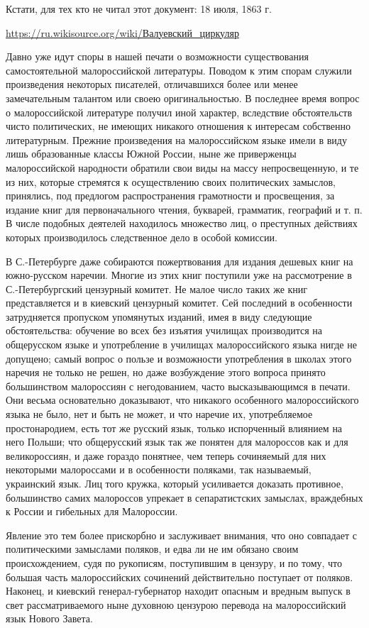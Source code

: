 \begin{itemize}
Кстати, для тех кто не читал этот документ: 18 июля, 1863 г.

\url{https://ru.wikisource.org/wiki/Валуевский_циркуляр}

Давно уже идут споры в нашей печати о возможности существования самостоятельной
малороссийской литературы. Поводом к этим спорам служили произведения некоторых
писателей, отличавшихся более или менее замечательным талантом или своею
оригинальностью. В последнее время вопрос о малороссийской литературе получил
иной характер, вследствие обстоятельств чисто политических, не имеющих никакого
отношения к интересам собственно литературным. Прежние произведения на
малороссийском языке имели в виду лишь образованные классы Южной России, ныне
же приверженцы малороссийской народности обратили свои виды на массу
непросвещенную, и те из них, которые стремятся к осуществлению своих
политических замыслов, принялись, под предлогом распространения грамотности и
просвещения, за издание книг для первоначального чтения, букварей, грамматик,
географий и т. п. В числе подобных деятелей находилось множество лиц, о
преступных действиях которых производилось следственное дело в особой комиссии.

В С.-Петербурге даже собираются пожертвования для издания дешевых книг на
южно-русском наречии. Многие из этих книг поступили уже на рассмотрение в
С.-Петербургский цензурный комитет. Не малое число таких же книг представляется
и в киевский цензурный комитет. Сей последний в особенности затрудняется
пропуском упомянутых изданий, имея в виду следующие обстоятельства: обучение во
всех без изъятия училищах производится на общерусском языке и употребление в
училищах малороссийского языка нигде не допущено; самый вопрос о пользе и
возможности употребления в школах этого наречия не только не решен, но даже
возбуждение этого вопроса принято большинством малороссиян с негодованием,
часто высказывающимся в печати. Они весьма основательно доказывают, что
никакого особенного малороссийского языка не было, нет и быть не может, и что
наречие их, употребляемое простонародием, есть тот же русский язык, только
испорченный влиянием на него Польши; что общерусский язык так же понятен для
малороссов как и для великороссиян, и даже гораздо понятнее, чем теперь
сочиняемый для них некоторыми малороссами и в особенности поляками, так
называемый, украинский язык. Лиц того кружка, который усиливается доказать
противное, большинство самих малороссов упрекает в сепаратистских замыслах,
враждебных к России и гибельных для Малороссии.

Явление это тем более прискорбно и заслуживает внимания, что оно совпадает с
политическими замыслами поляков, и едва ли не им обязано своим происхождением,
судя по рукописям, поступившим в цензуру, и по тому, что большая часть
малороссийских сочинений действительно поступает от поляков. Наконец, и
киевский генерал-губернатор находит опасным и вредным выпуск в свет
рассматриваемого ныне духовною цензурою перевода на малороссийский язык Нового
Завета.


\end{itemize}
